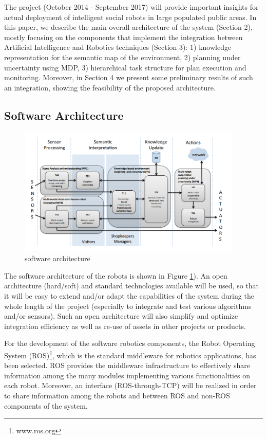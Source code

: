 The \coaches project (October 2014 - September 2017) will provide important insights for actual deployment of intelligent social robots in large populated public areas. 
In this paper, we describe the main overall architecture of the system (Section 2), mostly focusing on the components that implement the integration between Artificial Intelligence and Robotics techniques (Section 3): 1) knowledge representation for the semantic map of the environment,
2) planning under uncertainty using MDP, 3) hierarchical task structure for plan execution and monitoring. 
Moreover, in Section 4 we present some preliminary results of such an integration, showing the feasibility of the proposed architecture.


\subsection{Software Architecture}

\begin{figure}
\centering
\includegraphics[width=0.95\textwidth]{fig/COACHES_swarch.png}
\caption{\coaches software architecture}
\label{fig:swarch}
\end{figure}

The software architecture of the \coaches robots is shown in Figure \ref{fig:swarch}).
An open architecture (hard/soft) and standard technologies available will be used, 
so that it will be easy to extend and/or adapt the capabilities of the system during the whole length of 
the  project  (especially  to  integrate  and  test  various  algorithms  and/or  sensors).  
Such an open architecture will also simplify and optimize integration efficiency as well as re-use of assets in other projects or products. 


For the development of the software robotics components, the Robot Operating System (ROS)\footnote{www.ros.org}, which is the standard middleware for robotics applications, has been selected.
ROS provides the middleware infrastructure to effectively share information among the many modules implementing various functionalities on each robot. Moreover, an interface (ROS-through-TCP) will be realized in order to share information among the robots and between ROS and non-ROS components of the system.

